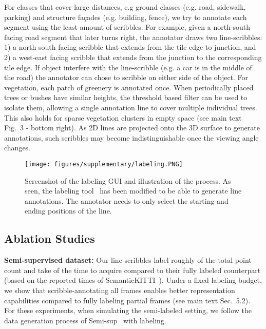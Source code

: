 \documentclass[10pt,twocolumn,letterpaper]{article}
\begin{document}
For classes that cover large distances, e.g ground classes (e.g. road, sidewalk, parking) and structure fa\c cades (e.g. building, fence), we try to annotate each segment using the least amount of scribbles. For example, given a north-south facing road segment that later turns right, the annotator draws two line-scribbles: 1) a north-south facing scribble that extends from the tile edge to junction, and 2) a west-east facing scribble that extends from the junction to the corresponding tile edge. If object interfere with the line-scribble (e.g. a car is in the middle of the road) the annotator can chose to scribble on either side of the object. For vegetation, each patch of greenery is annotated once. When periodically placed trees or bushes have similar heights, the threshold based filter can be used to isolate them, allowing a single annotation line to cover multiple individual trees. This also holds for sparse vegetation clusters in empty space (see main text Fig.~3 - bottom right). As 2D lines are projected onto the 3D surface to generate annotations, such scribbles may become indistinguishable once the viewing angle changes.

\begin{figure}[t]
    \centering
    \texttt{[image: figures/supplementary/labeling.PNG]}
    \caption{Screenshot of the labeling GUI and illustration of the process. As seen, the labeling tool~\cite{iccv2019semantickitti} has been modified to be able to generate line annotations. The annotator needs to only select the starting and ending positions of the line.}
    \label{fig:labeling}
\end{figure}

\subsection{Ablation Studies}

\noindent \textbf{Semi-supervised dataset:} Our line-scribbles label roughly  of the total point count and take  of the time to acquire compared to their fully labeled counterpart (based on the reported times of SemanticKITTI~\cite{iccv2019semantickitti}). Under a fixed labeling budget, we show that scribble-annotating all frames enables better representation capabilities compared to fully labeling partial frames (see main text Sec.~5.2). For these experiments, when simulating the semi-labeled setting, we follow the data generation process of Semi-sup~\cite{iccv2021guided} with  labeling.
\end{document}
